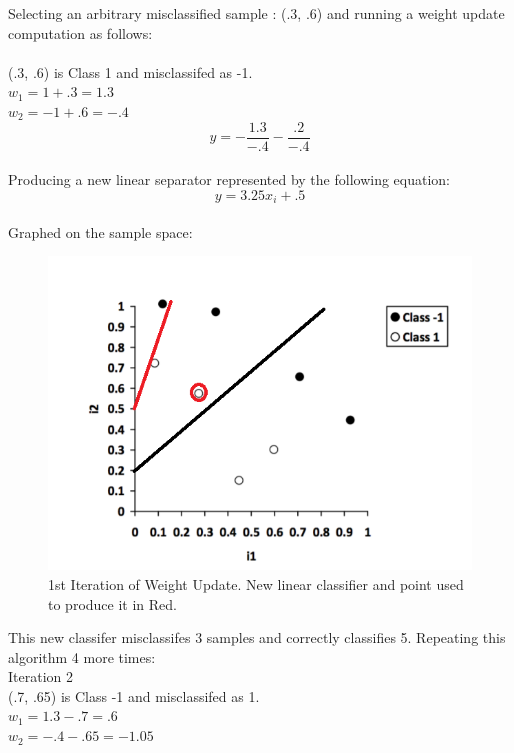 \documentclass[12pt]{article}
\begin{document}
Selecting an arbitrary misclassified sample : (.3, .6) and running a weight update computation as follows:\\
\\
(.3, .6) is Class 1 and misclassifed as -1.\\
$w_1 = 1+.3 = 1.3$\\
$w_2= -1 + .6 = -.4$\\
\begin{equation}
y = -\frac{1.3}{-.4} - \frac{.2}{-.4}
\end{equation}\\
Producing a new linear separator represented by the following equation:\\
\begin{equation}
y = 3.25x_i + .5
\end{equation}\\
Graphed on the sample space: \\
\begin{figure}[H]
    \centering
    \includegraphics[width=1\textwidth]{question_4_plot_a_it1}
    \caption{1st Iteration of Weight Update. New linear classifier and point used to produce it in Red.}
    \label{fig:question_4_plot_a_it1}
\end{figure}
This new classifer misclassifes 3 samples and correctly classifies 5.
Repeating this algorithm 4 more times:\\
Iteration 2 \\
(.7, .65) is Class -1 and misclassifed as 1.\\
$w_1 = 1.3-.7 = .6$\\
$w_2= -.4 - .65 = -1.05$\\
\end{document}
